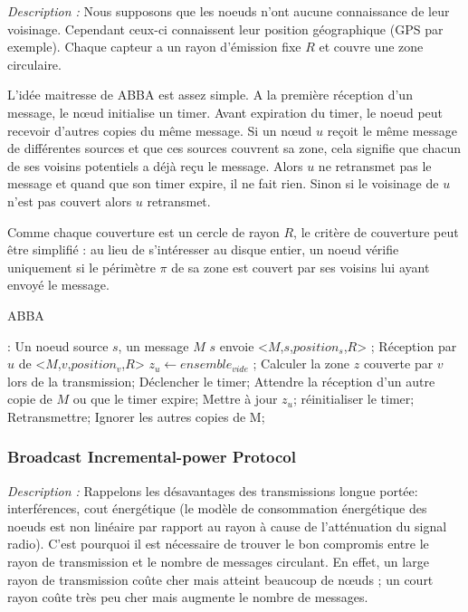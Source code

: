 \emph{Description :} Nous supposons que les noeuds n'ont aucune connaissance de leur voisinage. Cependant ceux-ci connaissent leur position géographique (GPS par exemple). Chaque capteur a un rayon d'émission fixe $R$ et couvre une zone circulaire.


L'idée maitresse de ABBA est assez simple. A la première réception d'un message, le nœud initialise un timer. Avant expiration du timer, le noeud peut recevoir d'autres copies du même message. Si un nœud $u$ reçoit le même message de différentes sources et que ces sources couvrent sa zone, cela signifie que chacun de ses voisins potentiels a déjà reçu le message. Alors $u$ ne retransmet pas le message et quand que son timer expire, il ne fait rien. Sinon si le voisinage de $u$ n'est pas couvert alors $u$ retransmet.

Comme chaque couverture est un cercle de rayon $R$, le critère de couverture peut être simplifié : au lieu de s'intéresser au disque entier, un noeud vérifie uniquement si le périmètre $\pi$ de sa zone est couvert par ses voisins lui ayant envoyé le message.


\begin{algorithm}[H]
\caption{ABBA}
\label{ABBA}
\begin{algorithmic}
\REQUIRE:
Un noeud source $s$, un message $M$
\STATE $s$ envoie  <$M$,$s$,$position_s$,$R$> ;
\STATE Réception  par  $u$ de  <$M$,$v$,$position_v$,$R$>
\STATE $z_u\leftarrow ensemble_{vide}$ ;
\STATE Calculer la zone $z$ couverte par $v$ lors de la transmission;
\STATE Déclencher le timer;
\REPEAT
    \STATE Attendre la réception d'un autre copie de $M$ ou que le timer expire;
	\STATE Mettre à jour $z_u$;
	\STATE réinitialiser le timer;
    \ENDIF
{}
    \STATE Retransmettre;
\ENDIF
     \STATE Ignorer les autres copies de M;

\end{algorithmic}
\end{algorithm}


\subsubsection{Broadcast Incremental-power Protocol \cite{Wieselthier2000}}



\emph{Description :} Rappelons les désavantages des transmissions longue portée: interférences, cout énergétique (le modèle de consommation énergétique des noeuds est non linéaire par rapport au rayon à cause de l'atténuation du signal radio).
C'est pourquoi il est nécessaire de trouver le bon compromis entre le rayon de transmission et le nombre de messages circulant. En effet, un large rayon de transmission coûte cher mais atteint beaucoup de nœuds ; un court rayon coûte très peu cher mais augmente le nombre de messages. 

